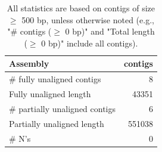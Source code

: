 \documentclass[12pt,a4paper]{article}
\begin{document}
\begin{table}[ht]
\begin{center}
\caption{All statistics are based on contigs of size $\geq$ 500 bp, unless otherwise noted (e.g., "\# contigs ($\geq$ 0 bp)" and "Total length ($\geq$ 0 bp)" include all contigs).}
\begin{tabular}{|l*{1}{|r}|}
\hline
Assembly & contigs \\ \hline
\# fully unaligned contigs & 8 \\ \hline
Fully unaligned length & 43351 \\ \hline
\# partially unaligned contigs & 6 \\ \hline
Partially unaligned length & 551038 \\ \hline
\# N's & 0 \\ \hline
\end{tabular}
\end{center}
\end{table}
\end{document}
